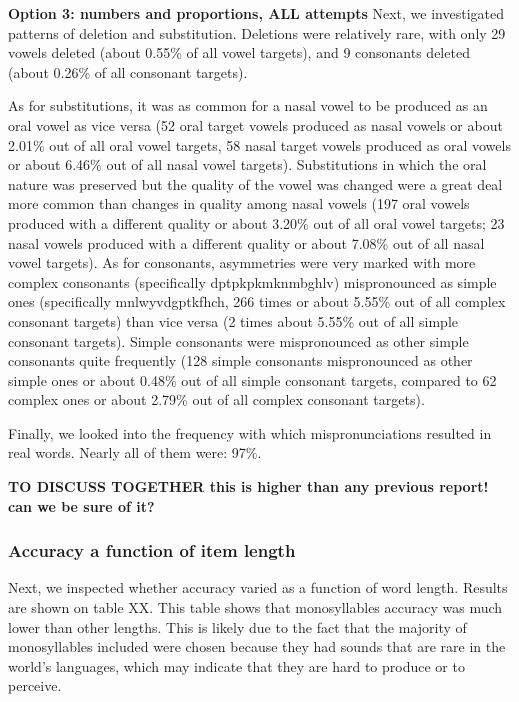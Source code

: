 \documentclass[english,,man,floatsintext]{apa6}
\begin{document}
\textbf{Option 3: numbers and proportions, ALL attempts} Next, we
investigated patterns of deletion and substitution. Deletions were
relatively rare, with only 29 vowels deleted (about 0.55\% of all vowel
targets), and 9 consonants deleted (about 0.26\% of all consonant
targets).

As for substitutions, it was as common for a nasal vowel to be produced
as an oral vowel as vice versa (52 oral target vowels produced as nasal
vowels or about 2.01\% out of all oral vowel targets, 58 nasal target
vowels produced as oral vowels or about 6.46\% out of all nasal vowel
targets). Substitutions in which the oral nature was preserved but the
quality of the vowel was changed were a great deal more common than
changes in quality among nasal vowels (197 oral vowels produced with a
different quality or about 3.20\% out of all oral vowel targets; 23
nasal vowels produced with a different quality or about 7.08\% out of
all nasal vowel targets). As for consonants, asymmetries were very
marked with more complex consonants (specifically dptpkpkmknmbghlv)
mispronounced as simple ones (specifically mnlwyvdgptkfhch, 266 times or
about 5.55\% out of all complex consonant targets) than vice versa (2
times about 5.55\% out of all simple consonant targets). Simple
consonants were mispronounced as other simple consonants quite
frequently (128 simple consonants mispronounced as other simple ones or
about 0.48\% out of all simple consonant targets, compared to 62 complex
ones or about 2.79\% out of all complex consonant targets).

Finally, we looked into the frequency with which mispronunciations
resulted in real words. Nearly all of them were: 97\%.

\textbf{TO DISCUSS TOGETHER this is higher than any previous report! can
we be sure of it?}

\subsubsection{Accuracy a function of item
length}\label{accuracy-a-function-of-item-length}

Next, we inspected whether accuracy varied as a function of word length.
Results are shown on table XX. This table shows that monosyllables
accuracy was much lower than other lengths. This is likely due to the
fact that the majority of monosyllables included were chosen because
they had sounds that are rare in the world's languages, which may
indicate that they are hard to produce or to perceive.
\end{document}
